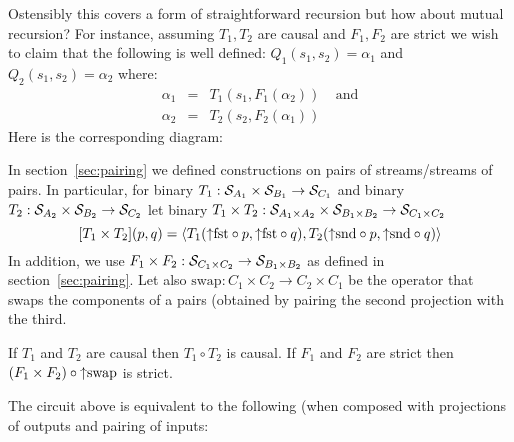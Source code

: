 Ostensibly this covers a form of straightforward recursion but how about mutual recursion? For instance, assuming $T_1,T_2$ are causal and $F_1,F_2$ are strict we wish to claim that the following is well defined: $Q_1(s_1,s_2)=\alpha_1$ and $Q_2(s_1,s_2)=\alpha_2$ where:
\begin{eqnarray*}
\alpha_1 & = & T_1(s_1,F_1(\alpha_2))~~~~~\mbox{and}\\
\alpha_2 & = & T_2(s_2,F_2(\alpha_1))
\end{eqnarray*}
Here is the corresponding diagram:


In section~\ref{sec:pairing} we defined constructions on pairs of streams/streams of pairs. 
In particular, for binary $T_1:\mathcal{S}_{A_1}\times\mathcal{S}_{B_1}\to\mathcal{S}_{C_1}$ and 
binary $T_2:\mathcal{S}_{A_2}\times\mathcal{S}_{B_2}\to\mathcal{S}_{C_2}$ 
let
binary $T_1\times T_2:\mathcal{S}_{A_1\times A_2}\times\mathcal{S}_{B_1\times B_2}\to\mathcal{S}_{C_1\times C_2}$ 
$$
[T_1\times T_2](p,q) = \langle T_1({\uparrow}\mbox{fst}\circ p,{\uparrow}\mbox{fst}\circ q),T_2({\uparrow}\mbox{snd}\circ p,{\uparrow}\mbox{snd}\circ q) \rangle
$$
In addition, we use $F_1\times F_2:\mathcal{S}_{C_1\times C_2}\to\mathcal{S}_{B_1\times B_2}$ as defined in section~\ref{sec:pairing}. Let also $\mbox{swap}: C_1\times C_2 \to C_2 \times C_1$
be the operator that swaps the components of a pairs (obtained by pairing the second projection
with the third.
\begin{proposition}
If $T_1$ and $T_2$ are causal then $T_1\circ T_2$ is causal. If $F_1$ and $F_2$ are strict then
$(F_1\times F_2)\circ{\uparrow}\mbox{swap}$ is strict.
\end{proposition}
The circuit above is equivalent to the following (when composed with projections of outputs
and pairing of inputs:

